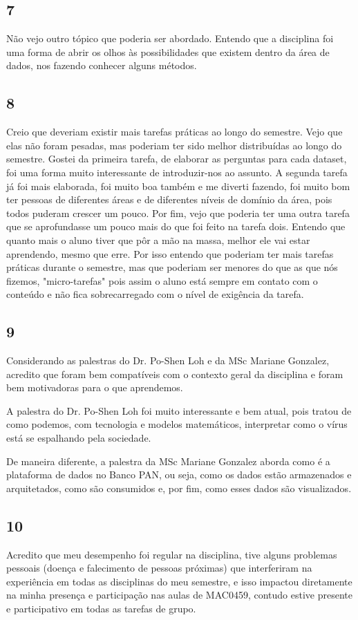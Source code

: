 \documentclass[
	10pt,
	parskip=half-,		
	paper=a4,			
	english, portuguese		
	]{scrartcl}
\begin{document}
    \subsection*{7}
    Não vejo outro tópico que poderia ser abordado. Entendo que a disciplina foi uma forma de abrir os olhos às possibilidades que existem dentro da área de dados, nos fazendo conhecer alguns métodos.
    \subsection*{8}
    Creio que deveriam existir mais tarefas práticas ao longo do semestre. Vejo que elas não foram pesadas, mas poderiam ter sido melhor distribuídas ao longo do semestre.  Gostei da primeira tarefa, de elaborar as perguntas para cada dataset, foi uma forma muito interessante de introduzir-nos ao assunto. A segunda tarefa já foi mais elaborada, foi muito boa também e me diverti fazendo, foi muito bom ter pessoas de diferentes áreas e de diferentes níveis de domínio da área, pois todos puderam crescer um pouco. Por fim, vejo que poderia ter uma outra tarefa que se aprofundasse um pouco mais do que foi feito na tarefa dois. Entendo que quanto mais o aluno tiver que pôr a mão na massa, melhor ele vai estar aprendendo, mesmo que erre. Por isso entendo que poderiam ter mais tarefas práticas durante o semestre, mas que poderiam ser menores do que as que nós fizemos, "micro-tarefas" pois assim o aluno está sempre em contato com o conteúdo e não fica sobrecarregado com o nível de exigência da tarefa.
    
    \subsection*{9}
    Considerando as palestras do Dr. Po-Shen Loh e da MSc Mariane Gonzalez, acredito que foram bem compatíveis com o contexto geral da disciplina e foram bem motivadoras para o que aprendemos. 
    
    A palestra do Dr. Po-Shen Loh foi muito interessante e bem atual, pois tratou de como podemos, com tecnologia e modelos matemáticos, interpretar como o vírus está se espalhando pela sociedade.
    
    De maneira diferente, a palestra da MSc Mariane Gonzalez aborda como é a plataforma de dados no Banco PAN, ou seja, como os dados estão armazenados e arquitetados, como são consumidos e, por fim, como esses dados são visualizados.
    
    \subsection*{10}
    Acredito que meu desempenho foi regular na disciplina, tive alguns problemas pessoais (doença e falecimento de pessoas próximas) que interferiram na experiência em todas as disciplinas do meu semestre, e isso impactou diretamente na minha presença e participação nas aulas de MAC0459, contudo estive presente e participativo em todas as tarefas de grupo.
    
\end{document}
